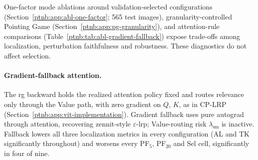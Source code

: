One-factor mode ablations around validation-selected configurations (Section~\ref{ptnb:app:abl-one-factor}; 565 test images), granularity-controlled Pointing Game (Section~\ref{ptnb:app:pg-granularity}), and attention-rule comparisons (Table~\ref{ptnb:tab:abl-gradient-fallback}) expose trade-offs among localization, perturbation faithfulness and robustness. These diagnostics do not affect selection.

\paragraph{Gradient-fallback attention.}\label{ptnb:app:abl-gradient-fallback}

The \ac{rg} backward holds the realized attention policy fixed and routes relevance only through the Value path, with zero gradient on $Q$, $K$, as in CP-LRP~\parencite{Ali2022AttnLRP} (Section~\ref{ptnb:app:vit-implementation}). Gradient fallback uses pure autograd through attention, recovering zennit-style $\varepsilon$-\ac{lrp}; Value-routing risk $\lambda_\text{sm}$ is inactive. Fallback lowers all three localization metrics in every configuration (AL and TK significantly throughout) and worsens every PF$_5$, PF$_{20}$ and Sel cell, significantly in four of nine.


